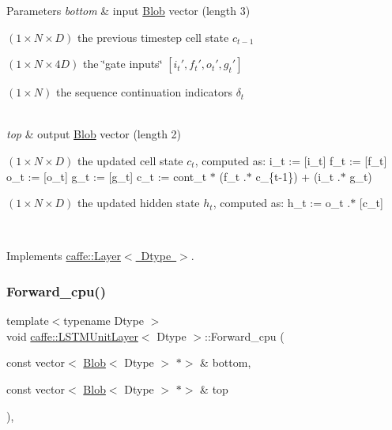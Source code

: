 \begin{DoxyParams}{Parameters}
{\em bottom} & input \mbox{\hyperlink{classcaffe_1_1_blob}{Blob}} vector (length 3)
\begin{DoxyEnumerate}
\item $ (1 \times N \times D) $ the previous timestep cell state $ c_{t-1} $
\item $ (1 \times N \times 4D) $ the \char`\"{}gate inputs\char`\"{} $ [i_t', f_t', o_t', g_t'] $
\item $ (1 \times N) $ the sequence continuation indicators $ \delta_t $ 
\end{DoxyEnumerate}\\
\hline
{\em top} & output \mbox{\hyperlink{classcaffe_1_1_blob}{Blob}} vector (length 2)
\begin{DoxyEnumerate}
\item $ (1 \times N \times D) $ the updated cell state $ c_t $, computed as\+: i\+\_\+t \+:= \mbox{[}i\+\_\+t\textquotesingle{}\mbox{]} f\+\_\+t \+:= \mbox{[}f\+\_\+t\textquotesingle{}\mbox{]} o\+\_\+t \+:= \mbox{[}o\+\_\+t\textquotesingle{}\mbox{]} g\+\_\+t \+:= \mbox{[}g\+\_\+t\textquotesingle{}\mbox{]} c\+\_\+t \+:= cont\+\_\+t $\ast$ (f\+\_\+t .$\ast$ c\+\_\+\{t-\/1\}) + (i\+\_\+t .$\ast$ g\+\_\+t)
\item $ (1 \times N \times D) $ the updated hidden state $ h_t $, computed as\+: h\+\_\+t \+:= o\+\_\+t .$\ast$ \mbox{[}c\+\_\+t\mbox{]} 
\end{DoxyEnumerate}\\
\hline
\end{DoxyParams}


Implements \mbox{\hyperlink{classcaffe_1_1_layer_a576ac6a60b1e99fe383831f52a6cea77}{caffe\+::\+Layer$<$ Dtype $>$}}.

\mbox{\label{classcaffe_1_1_l_s_t_m_unit_layer_ad44e302db28f57bfdfbbbde452deb4fd}} 
\subsubsection{\texorpdfstring{Forward\+\_\+cpu()}{Forward\_cpu()}\hspace{0.1cm}{\footnotesize\ttfamily [2/2]}}
{\footnotesize\ttfamily template$<$typename Dtype $>$ \\
void \mbox{\hyperlink{classcaffe_1_1_l_s_t_m_unit_layer}{caffe\+::\+L\+S\+T\+M\+Unit\+Layer}}$<$ Dtype $>$\+::Forward\+\_\+cpu (\begin{DoxyParamCaption}\item[{const vector$<$ \mbox{\hyperlink{classcaffe_1_1_blob}{Blob}}$<$ Dtype $>$ $\ast$$>$ \&}]{bottom,  }\item[{const vector$<$ \mbox{\hyperlink{classcaffe_1_1_blob}{Blob}}$<$ Dtype $>$ $\ast$$>$ \&}]{top }\end{DoxyParamCaption})\hspace{0.3cm}{\ttfamily [protected]}, {\ttfamily [virtual]}}


